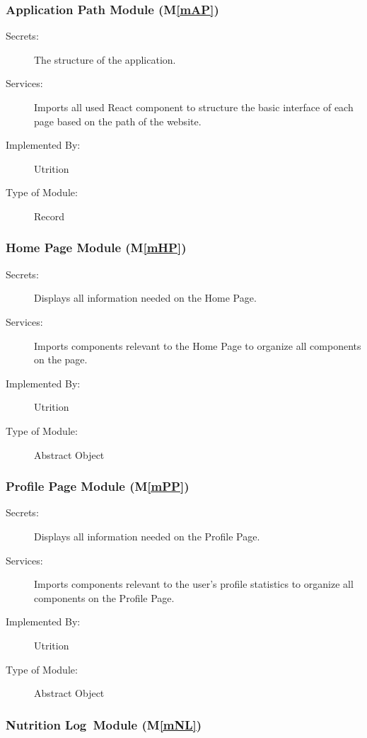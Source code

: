 \documentclass[12pt, titlepage]{article}
\newcommand{\mref}[1]{M\ref{#1}}
\begin{document}
\subsubsection{Application Path Module (\mref{mAP})}

\begin{description}
	\item[Secrets:] The structure of the application.
	\item[Services:] Imports all used React component to structure the basic 
	interface of each page based on the path of the website.
	\item[Implemented By:] Utrition
	\item[Type of Module:] Record
\end{description}

\subsubsection{Home Page Module (\mref{mHP})}

\begin{description}
\item[Secrets:]Displays all information needed on the Home Page.
\item[Services:] Imports components relevant to the Home Page to organize all components on the page. 
\item[Implemented By:] Utrition
\item[Type of Module:] Abstract Object
\end{description}

\subsubsection{Profile Page Module (\mref{mPP})}

\begin{description}
\item[Secrets:]Displays all information needed on the Profile Page.
\item[Services:] Imports components relevant to the user's profile statistics to organize all components on the Profile Page.
\item[Implemented By:] Utrition
\item[Type of Module:] Abstract Object
\end{description}

\subsubsection{Nutrition Log Module (\mref{mNL})}
\end{document}

